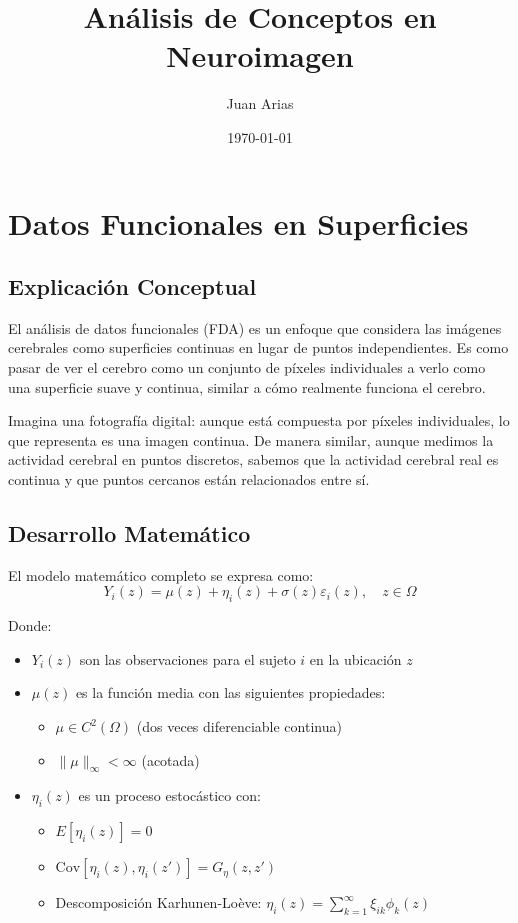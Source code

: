\documentclass[12pt,a4paper]{article}
\title{Análisis de Conceptos en Neuroimagen}
\author{Juan Arias}
\date{\today}
\begin{document}
\maketitle

\section{Datos Funcionales en Superficies}

\subsection{Explicación Conceptual}
El análisis de datos funcionales (FDA) es un enfoque que considera las imágenes cerebrales como superficies continuas en lugar de puntos independientes. Es como pasar de ver el cerebro como un conjunto de píxeles individuales a verlo como una superficie suave y continua, similar a cómo realmente funciona el cerebro.

Imagina una fotografía digital: aunque está compuesta por píxeles individuales, lo que representa es una imagen continua. De manera similar, aunque medimos la actividad cerebral en puntos discretos, sabemos que la actividad cerebral real es continua y que puntos cercanos están relacionados entre sí.

\subsection{Desarrollo Matemático}
El modelo matemático completo se expresa como:
\begin{equation}
Y_i(z) = \mu(z) + \eta_i(z) + \sigma(z)\varepsilon_i(z), \quad z \in \Omega
\end{equation}

Donde:
\begin{itemize}
\item $Y_i(z)$ son las observaciones para el sujeto $i$ en la ubicación $z$
\item $\mu(z)$ es la función media con las siguientes propiedades:
  \begin{itemize}
  \item $\mu \in C^2(\Omega)$ (dos veces diferenciable continua)
  \item $\|\mu\|_\infty < \infty$ (acotada)
  \end{itemize}
\item $\eta_i(z)$ es un proceso estocástico con:
  \begin{itemize}
  \item $E[\eta_i(z)] = 0$
  \item $\text{Cov}[\eta_i(z), \eta_i(z')] = G_\eta(z,z')$
  \item Descomposición Karhunen-Loève: $\eta_i(z) = \sum_{k=1}^{\infty} \xi_{ik}\phi_k(z)$
  \end{itemize}
\end{itemize}
\end{document}
